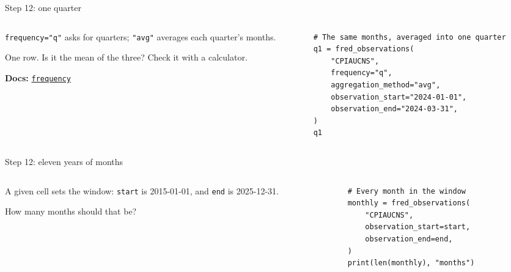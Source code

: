 \documentclass[9pt,aspectratio=169]{beamer}
\begin{document}
\begin{frame}[fragile]{Step 12: one quarter}
    \begin{columns}[T]
        \begin{column}{0.37\textwidth}
            \texttt{frequency="q"} asks for quarters; \texttt{"avg"} averages each quarter's months.

            \medskip
            One row. Is it the mean of the three? Check it with a calculator.

            \medskip
            {\scriptsize\textbf{Docs:} \href{https://fred.stlouisfed.org/docs/api/fred/series_observations.html\#frequency}{\texttt{frequency}}\par}
        \end{column}
        \begin{column}{0.6\textwidth}
\begin{lstlisting}
# The same months, averaged into one quarter
q1 = fred_observations(
    "CPIAUCNS",
    frequency="q",
    aggregation_method="avg",
    observation_start="2024-01-01",
    observation_end="2024-03-31",
)
q1
\end{lstlisting}
        \end{column}
    \end{columns}
\end{frame}

\begin{frame}[fragile]{Step 12: eleven years of months}
    \begin{columns}[T]
        \begin{column}{0.37\textwidth}
            A given cell sets the window: \texttt{start} is 2015-01-01, and \texttt{end} is 2025-12-31.

            \medskip
            How many months should that be?
        \end{column}
        \begin{column}{0.6\textwidth}
\begin{lstlisting}
# Every month in the window
monthly = fred_observations(
    "CPIAUCNS",
    observation_start=start,
    observation_end=end,
)
print(len(monthly), "months")
\end{lstlisting}
        \end{column}
    \end{columns}
\end{frame}
\end{document}
